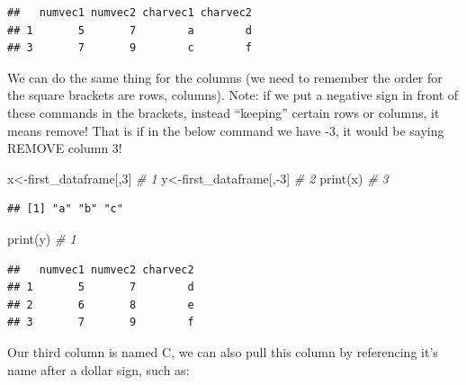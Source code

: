 \documentclass[
]{book}
\newenvironment{Shaded}{\begin{snugshade}}{\end{snugshade}}
\newcommand{\CommentTok}[1]{\textcolor[rgb]{0.56,0.35,0.01}{\textit{#1}}}
\newcommand{\DecValTok}[1]{\textcolor[rgb]{0.00,0.00,0.81}{#1}}
\newcommand{\FunctionTok}[1]{\textcolor[rgb]{0.00,0.00,0.00}{#1}}
\newcommand{\NormalTok}[1]{#1}
\newcommand{\OtherTok}[1]{\textcolor[rgb]{0.56,0.35,0.01}{#1}}
\newcommand{\SpecialCharTok}[1]{\textcolor[rgb]{0.00,0.00,0.00}{#1}}
\begin{document}
\begin{verbatim}
##   numvec1 numvec2 charvec1 charvec2
## 1       5       7        a        d
## 3       7       9        c        f
\end{verbatim}

We can do the same thing for the columns (we need to remember the order for the square brackets are rows, columns). Note: if we put a negative sign in front of these commands in the brackets, instead ``keeping'' certain rows or columns, it means remove! That is if in the below command we have -3, it would be saying REMOVE column 3!

\begin{Shaded}
\begin{Highlighting}[numbers=left,,]
\NormalTok{x}\OtherTok{\textless{}{-}}\NormalTok{first\_dataframe[,}\DecValTok{3}\NormalTok{]   }\CommentTok{\# 1}
\NormalTok{y}\OtherTok{\textless{}{-}}\NormalTok{first\_dataframe[,}\SpecialCharTok{{-}}\DecValTok{3}\NormalTok{]  }\CommentTok{\# 2}
\FunctionTok{print}\NormalTok{(x)                 }\CommentTok{\# 3}
\end{Highlighting}
\end{Shaded}

\begin{verbatim}
## [1] "a" "b" "c"
\end{verbatim}

\begin{Shaded}
\begin{Highlighting}[numbers=left,,]
\FunctionTok{print}\NormalTok{(y)  }\CommentTok{\# 1}
\end{Highlighting}
\end{Shaded}

\begin{verbatim}
##   numvec1 numvec2 charvec2
## 1       5       7        d
## 2       6       8        e
## 3       7       9        f
\end{verbatim}

Our third column is named C, we can also pull this column by referencing it's name after a dollar sign, such as:

\begin{Shaded}
\end{Shaded}
\end{document}
